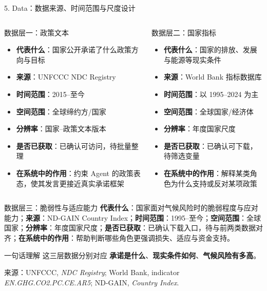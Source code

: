 \documentclass[aspectratio=169,10.5pt]{ctexbeamer}
\newcommand{\source}[1]{\vfill{\tiny\color{textgray}来源：#1}}
\begin{document}
\begin{frame}{5. Data：数据来源、时间范围与尺度设计}
  \begin{columns}[T]
    \begin{block}{数据层一：政策文本}
      \begin{itemize}
        \item \textbf{代表什么}：国家公开承诺了什么政策方向与目标
        \item \textbf{来源}：UNFCCC NDC Registry
        \item \textbf{时间范围}：2015--至今
        \item \textbf{空间范围}：全球缔约方/国家
        \item \textbf{分辨率}：国家--政策文本版本
        \item \textbf{是否已获取}：已确认可访问，待批量整理
        \item \textbf{在系统中的作用}：约束 Agent 的政策表态，使其发言更接近真实承诺框架
      \end{itemize}
    \end{block}
    \begin{block}{数据层二：国家指标}
      \begin{itemize}
        \item \textbf{代表什么}：国家的排放、发展与能源等现实条件
        \item \textbf{来源}：World Bank 指标数据库
        \item \textbf{时间范围}：以 1995--2024 为主
        \item \textbf{空间范围}：全球国家/经济体
        \item \textbf{分辨率}：年度国家尺度
        \item \textbf{是否已获取}：已确认可下载，待筛选变量
        \item \textbf{在系统中的作用}：解释某类角色为什么支持或反对某项政策
      \end{itemize}
    \end{block}
  \end{columns}
  \begin{block}{数据层三：脆弱性与适应能力}
    \textbf{代表什么}：国家面对气候风险时的脆弱程度与应对能力；\textbf{来源}：ND-GAIN Country Index；\textbf{时间范围}：1995--至今；\textbf{空间范围}：全球国家；\textbf{分辨率}：年度国家尺度；\textbf{是否已获取}：已确认下载入口，待与前两类数据对齐；\textbf{在系统中的作用}：帮助判断哪些角色更强调损失、适应与资金支持。
  \end{block}
  \begin{alertblock}{一句话理解}
    这三层数据分别对应 \textbf{承诺是什么}、\textbf{现实条件如何}、\textbf{气候风险有多高}。
  \end{alertblock}
  \source{UNFCCC, \emph{NDC Registry}; World Bank, indicator \emph{EN.GHG.CO2.PC.CE.AR5}; ND-GAIN, \emph{Country Index}.}
\end{frame}
\end{document}
